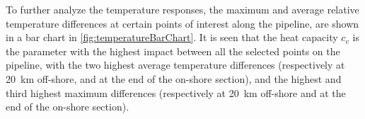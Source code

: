 
To further analyze the temperature responses, the maximum and average relative temperature differences at certain points of interest along the pipeline, are shown in a bar chart in \cref{fig:temperatureBarChart}. %
It is seen that the heat capacity $c_v$ is the parameter with the highest impact between all the selected points on the pipeline, with the two highest average temperature differences (respectively at \SI{20}{\kilo\meter} off-shore, and at the end of the on-shore section), and the highest and third highest maximum differences (respectively at \SI{20}{\kilo\meter} off-shore and at the end of the on-shore section). 



